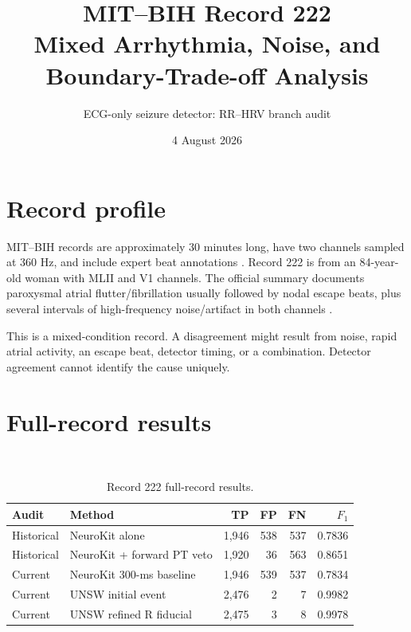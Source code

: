 \documentclass[10pt]{article}
\title{MIT--BIH Record 222\\Mixed Arrhythmia, Noise, and Boundary-Trade-off Analysis}
\author{ECG-only seizure detector: RR--HRV branch audit}
\date{4 August 2026}
\begin{document}
\maketitle


\section{Record profile}
MIT--BIH records are approximately 30 minutes long, have two channels sampled at 360 Hz, and include expert beat annotations \cite{moody2001mitbih,physionetmitdb,goldberger2000physiobank}. Record 222 is from an 84-year-old woman with MLII and V1 channels. The official summary documents paroxysmal atrial flutter/fibrillation usually followed by nodal escape beats, plus several intervals of high-frequency noise/artifact in both channels \cite{physionetmitdb}.

This is a mixed-condition record. A disagreement might result from noise, rapid atrial activity, an escape beat, detector timing, or a combination. Detector agreement cannot identify the cause uniquely.

\section{Full-record results}
\metricdef\ \provenance

\begin{table}[H]
\centering
\caption{Record 222 full-record results.}
\begin{tabular}{@{}llrrrr@{}}
\toprule
Audit & Method & TP & FP & FN & $F_1$\\
\midrule
Historical & NeuroKit alone & 1,946 & 538 & 537 & 0.7836\\
Historical & NeuroKit + forward PT veto & 1,920 & 36 & 563 & 0.8651\\
Current & NeuroKit 300-ms baseline & 1,946 & 539 & 537 & 0.7834\\
Current & UNSW initial event & 2,476 & 2 & 7 & 0.9982\\
Current & UNSW refined R fiducial & 2,475 & 3 & 8 & 0.9978\\
\bottomrule
\end{tabular}
\end{table}
\end{document}
